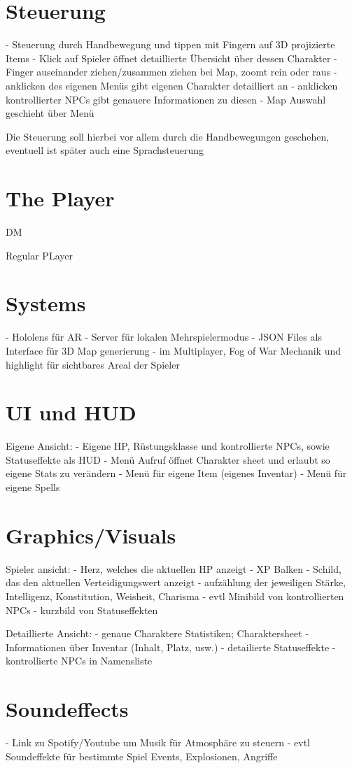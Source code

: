 \documentclass[11pt]{article}
\begin{document}
    \section{Steuerung}\label{sec:chapter_controls}
    - Steuerung durch Handbewegung und tippen mit Fingern auf 3D projizierte Items
    - Klick auf Spieler öffnet detaillierte Übersicht über dessen Charakter
    - Finger auseinander ziehen/zusammen ziehen bei Map, zoomt rein oder raus
    - anklicken des eigenen Menüs gibt eigenen Charakter detailliert an
    - anklicken kontrollierter NPCs gibt genauere Informationen zu diesen
    - Map Auswahl geschieht über Menü

    Die Steuerung soll hierbei vor allem durch die Handbewegungen geschehen, eventuell ist später auch eine
    Sprachsteuerung

    \section{The Player}
    DM


    Regular PLayer


    \section{Systems}
    - Hololens für AR
    - Server für lokalen Mehrspielermodus
    - JSON Files als Interface für 3D Map generierung
    - im Multiplayer, Fog of War Mechanik und highlight für sichtbares Areal der Spieler

    \section{UI und HUD}
    Eigene Ansicht:
    - Eigene HP, Rüstungsklasse und kontrollierte NPCs, sowie Statuseffekte als HUD
    - Menü Aufruf öffnet Charakter sheet und erlaubt so eigene Stats zu verändern
    - Menü für eigene Item (eigenes Inventar)
    - Menü für eigene Spells

    \section{Graphics/Visuals}
    Spieler ansicht:
    - Herz, welches die aktuellen HP anzeigt
    - XP Balken
    - Schild, das den aktuellen Verteidigungswert anzeigt
    - aufzählung der jeweiligen Stärke, Intelligenz, Konstitution, Weisheit, Charisma
    - evtl Minibild von kontrollierten NPCs
    - kurzbild von Statuseffekten

    Detaillierte Ansicht:
    - genaue Charaktere Statistiken; Charaktersheet
    - Informationen über Inventar (Inhalt, Platz, usw.)
    - detailierte Statuseffekte
    - kontrollierte NPCs in Namensliste

    \section{Soundeffects}
    - Link zu Spotify/Youtube um Musik für Atmosphäre zu steuern
    - evtl Soundeffekte für bestimmte Spiel Events, Explosionen, Angriffe
\end{document}
